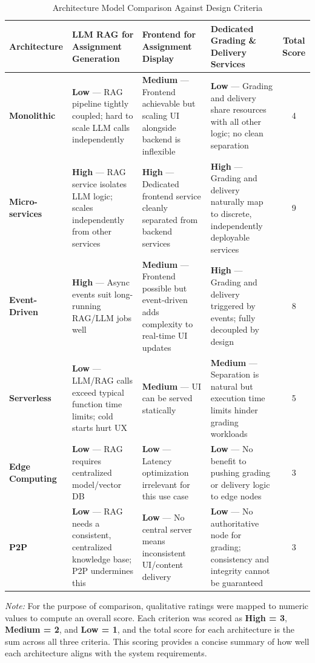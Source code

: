 \documentclass[12pt]{article}
\begin{document}
\begin{table}[h!]
\centering
\caption{Architecture Model Comparison Against Design Criteria}
\renewcommand{\arraystretch}{1.6}
\begin{tabularx}{\textwidth}{|>{\bfseries}p{2.5cm}|X|X|X|c|}
\hline
\textbf{Architecture} & \textbf{LLM RAG for Assignment Generation} & \textbf{Frontend for Assignment Display} & \textbf{Dedicated Grading \& Delivery Services} & \textbf{Total Score}\\
\hline
Monolithic       & \textbf{Low} --- RAG pipeline tightly coupled; hard to scale LLM calls independently & \textbf{Medium} --- Frontend achievable but scaling UI alongside backend is inflexible & \textbf{Low} --- Grading and delivery share resources with all other logic; no clean separation & 4\\
\hline
Micro-services    & \textbf{High} --- RAG service isolates LLM logic; scales independently from other services & \textbf{High} --- Dedicated frontend service cleanly separated from backend services & \textbf{High} --- Grading and delivery naturally map to discrete, independently deployable services & 9\\
\hline
Event-Driven     & \textbf{High} --- Async events suit long-running RAG/LLM jobs well & \textbf{Medium} --- Frontend possible but event-driven adds complexity to real-time UI updates & \textbf{High} --- Grading and delivery triggered by events; fully decoupled by design & 8\\
\hline
Serverless       & \textbf{Low} --- LLM/RAG calls exceed typical function time limits; cold starts hurt UX & \textbf{Medium} --- UI can be served statically & \textbf{Medium} --- Separation is natural but execution time limits hinder grading workloads &5\\
\hline
Edge Computing   & \textbf{Low} --- RAG requires centralized model/vector DB & \textbf{Low} --- Latency optimization irrelevant for this use case & \textbf{Low} --- No benefit to pushing grading or delivery logic to edge nodes &3\\
\hline
P2P              & \textbf{Low} --- RAG needs a consistent, centralized knowledge base; P2P undermines this & \textbf{Low} --- No central server means inconsistent UI/content delivery & \textbf{Low} --- No authoritative node for grading; consistency and integrity cannot be guaranteed & 3\\
\hline
\end{tabularx}
\end{table}

\noindent\textit{Note:} For the purpose of comparison, qualitative ratings were mapped to numeric
values to compute an overall score. Each criterion was scored as \textbf{High = 3}, \textbf{Medium = 2},
and \textbf{Low = 1}, and the total score for each architecture is the sum across all three criteria.
This scoring provides a concise summary of how well each architecture aligns with the system
requirements.
\end{document}

